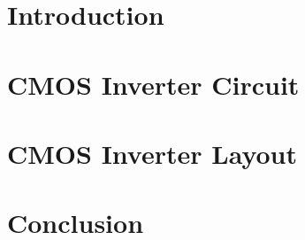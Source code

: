 \documentclass{article}
\begin{document}
\begin{titlepage}

\end{titlepage}
\section{Introduction}

\section{CMOS Inverter Circuit}

\section{CMOS Inverter Layout}

\section{Conclusion}

\end{document}
